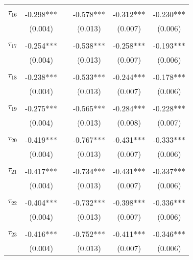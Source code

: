 \begin{tabular}{@{\extracolsep{-0pt}}lccccc}
                &           &&           &           &           \\[-2.1ex]
$\tau_{16}$     & -0.298*** && -0.578*** & -0.312*** & -0.230*** \\
                &  (0.004)  &&  (0.013)  &  (0.007)  &  (0.006)  \\
                &           &&           &           &           \\[-2.1ex]
$\tau_{17}$     & -0.254*** && -0.538*** & -0.258*** & -0.193*** \\
                &  (0.004)  &&  (0.013)  &  (0.007)  &  (0.006)  \\
                &           &&           &           &           \\[-2.1ex]
$\tau_{18}$     & -0.238*** && -0.533*** & -0.244*** & -0.178*** \\
                &  (0.004)  &&  (0.013)  &  (0.007)  &  (0.006)  \\
                &           &&           &           &           \\[-2.1ex]
$\tau_{19}$     & -0.275*** && -0.565*** & -0.284*** & -0.228*** \\
                &  (0.004)  &&  (0.013)  &  (0.008)  &  (0.007)  \\
                &           &&           &           &           \\[-2.1ex]
$\tau_{20}$     & -0.419*** && -0.767*** & -0.431*** & -0.333*** \\
                &  (0.004)  &&  (0.013)  &  (0.007)  &  (0.006)  \\
                &           &&           &           &           \\[-2.1ex]
$\tau_{21}$     & -0.417*** && -0.734*** & -0.431*** & -0.337*** \\
                &  (0.004)  &&  (0.013)  &  (0.007)  &  (0.006)  \\
                &           &&           &           &           \\[-2.1ex]
$\tau_{22}$     & -0.404*** && -0.732*** & -0.398*** & -0.336*** \\
                &  (0.004)  &&  (0.013)  &  (0.007)  &  (0.006)  \\
                &           &&           &           &           \\[-2.1ex]
$\tau_{23}$     & -0.416*** && -0.752*** & -0.411*** & -0.346*** \\
                &  (0.004)  &&  (0.013)  &  (0.007)  &  (0.006)  \\

\end{tabular}
